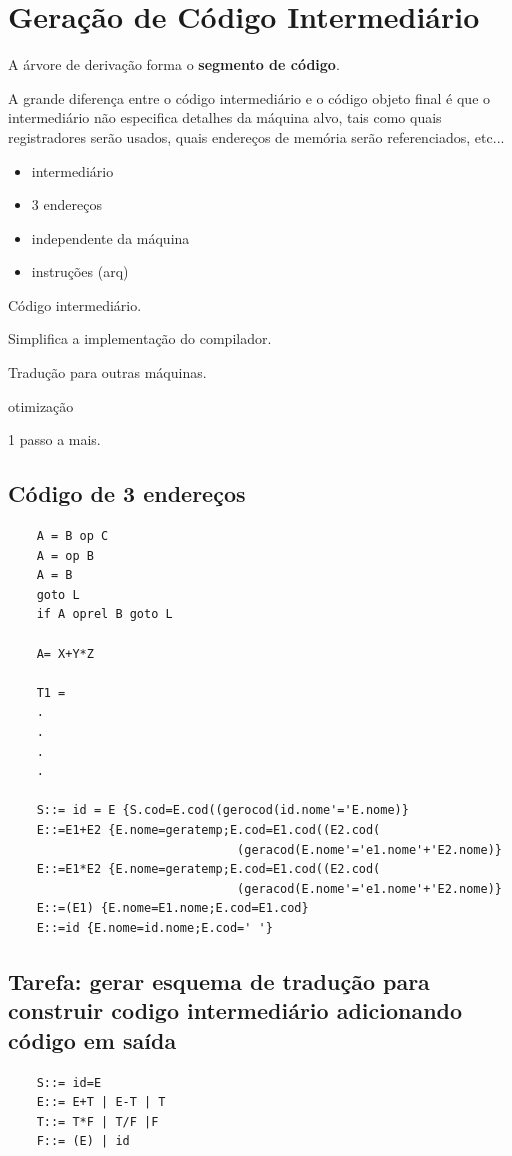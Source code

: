 \documentclass[ 12pt, a4paper]{article}
\begin{document}
\section{Geração de Código Intermediário}
	A árvore de derivação forma o \textbf{segmento de código}.


	A grande diferença entre o código intermediário e o código objeto final é que o intermediário não especifica detalhes da máquina alvo, tais como quais registradores serão usados, quais endereços de memória serão referenciados, etc...

	\begin{itemize}
		\item intermediário
		\item 3 endereços
		\item independente da máquina
		\item instruções (arq)
	\end{itemize}

	Código intermediário.

	Simplifica a implementação do compilador.


	Tradução para outras máquinas.

	otimização

	1 passo a mais.

	\subsection{Código de 3 endereços}

\begin{verbatim}
	A = B op C
	A = op B
	A = B
	goto L
	if A oprel B goto L

	A= X+Y*Z

	T1 = 
	.
	.
	.
	.

	S::= id = E {S.cod=E.cod((gerocod(id.nome'='E.nome)}
	E::=E1+E2 {E.nome=geratemp;E.cod=E1.cod((E2.cod(
				                (geracod(E.nome'='e1.nome'+'E2.nome)}
	E::=E1*E2 {E.nome=geratemp;E.cod=E1.cod((E2.cod(
				                (geracod(E.nome'='e1.nome'+'E2.nome)}
	E::=(E1) {E.nome=E1.nome;E.cod=E1.cod}
	E::=id {E.nome=id.nome;E.cod=' '}
\end{verbatim}
	\subsection{Tarefa: gerar esquema de tradução para construir codigo intermediário adicionando código em saída}
\begin{verbatim}
	S::= id=E
	E::= E+T | E-T | T
	T::= T*F | T/F |F
	F::= (E) | id
\end{verbatim}
\end{document}
